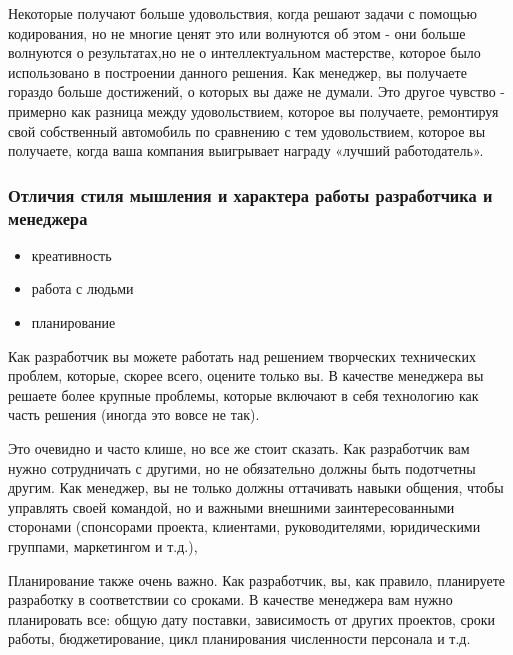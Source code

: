 \documentclass{../industrial-development}
\begin{document}
Некоторые получают больше удовольствия, когда решают задачи с помощью кодирования, но не многие ценят это или волнуются об этом - они больше волнуются о результатах,но не о интеллектуальном мастерстве, которое было использовано в построении данного решения. Как менеджер, вы получаете гораздо больше достижений, о которых вы даже не думали. Это другое чувство - примерно как разница между удовольствием, которое вы получаете, ремонтируя свой собственный автомобиль по сравнению с тем удовольствием, которое вы получаете, когда ваша компания выигрывает награду «лучший работодатель».
~\cite{From_programmer_to_manager}

\begin{frame}\frametitle{Отличия стиля мышления и характера работы разработчика и менеджера}
	\begin{itemize}
		\item креативность
		\item работа с людьми
		\item планирование
	\end{itemize}
\end{frame}
\lecturenotes
Как разработчик вы можете работать над решением творческих технических проблем, которые, скорее всего, оцените только вы. В качестве менеджера вы решаете более крупные проблемы, которые включают в себя технологию как часть решения (иногда это вовсе не так).

Это очевидно и часто клише, но все же стоит сказать. Как разработчик вам нужно сотрудничать с другими, но не обязательно должны быть подотчетны другим. Как менеджер, вы не только должны оттачивать навыки общения, чтобы управлять своей командой, но и важными внешними заинтересованными сторонами (спонсорами проекта, клиентами, руководителями, юридическими группами, маркетингом и т.д.),

Планирование также очень важно. Как разработчик, вы, как правило, планируете разработку в соответствии со сроками. В качестве менеджера вам нужно планировать все: общую дату поставки, зависимость от других проектов, сроки работы, бюджетирование, цикл планирования численности персонала и т.д.
~\cite{From_programmer_to_manager}


\end{document}
